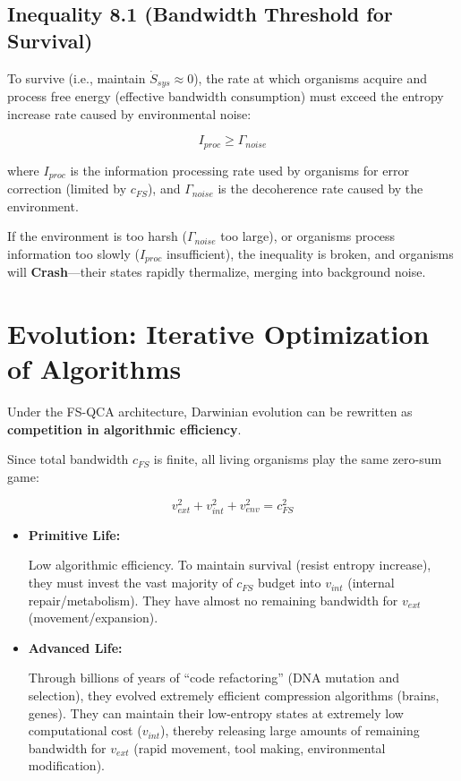 \documentclass[11pt,a4paper,twoside]{book}
\begin{document}
\subsection{Inequality 8.1 (Bandwidth Threshold for Survival)}

To survive (i.e., maintain $\dot{S}_{sys} \approx 0$), the rate at which organisms acquire and process free energy (effective bandwidth consumption) must exceed the entropy increase rate caused by environmental noise:

$$I_{proc} \ge \Gamma_{noise}$$

where $I_{proc}$ is the information processing rate used by organisms for error correction (limited by $c_{FS}$), and $\Gamma_{noise}$ is the decoherence rate caused by the environment.

If the environment is too harsh ($\Gamma_{noise}$ too large), or organisms process information too slowly ($I_{proc}$ insufficient), the inequality is broken, and organisms will \textbf{Crash}---their states rapidly thermalize, merging into background noise.

\section{Evolution: Iterative Optimization of Algorithms}

Under the FS-QCA architecture, Darwinian evolution can be rewritten as \textbf{competition in algorithmic efficiency}.

Since total bandwidth $c_{FS}$ is finite, all living organisms play the same zero-sum game:

$$v_{ext}^2 + v_{int}^2 + v_{env}^2 = c_{FS}^2$$

\begin{itemize}
\item \textbf{Primitive Life:}

   Low algorithmic efficiency. To maintain survival (resist entropy increase), they must invest the vast majority of $c_{FS}$ budget into $v_{int}$ (internal repair/metabolism). They have almost no remaining bandwidth for $v_{ext}$ (movement/expansion).

\item \textbf{Advanced Life:}

   Through billions of years of ``code refactoring'' (DNA mutation and selection), they evolved extremely efficient compression algorithms (brains, genes). They can maintain their low-entropy states at extremely low computational cost ($v_{int}$), thereby releasing large amounts of remaining bandwidth for $v_{ext}$ (rapid movement, tool making, environmental modification).
\end{itemize}
\end{document}

